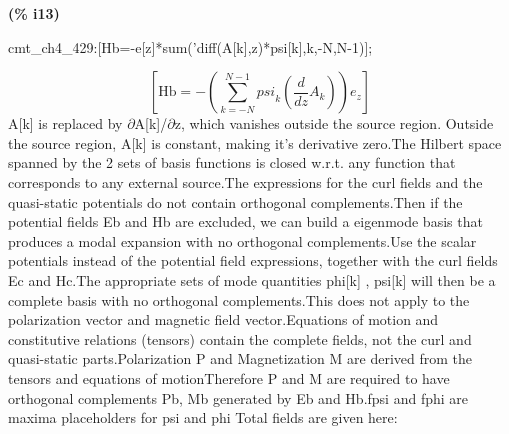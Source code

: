 \documentclass[fleqn]{article}
\begin{document}
\noindent
\begin{minipage}[t]{4.000000em}\color{red}\bfseries
(\% i13)	
\end{minipage}
\begin{minipage}[t]{\textwidth}\color{blue}
cmt\_ch4\_429:[Hb=-e[z]*sum('diff(A[k],z)*psi[k],k,-N,N-1)];
\end{minipage}
\[\displaystyle \tag{\% o13} 
\left[ \ensuremath{\mathrm{Hb}}=-\left( \sum_{k=-N}^{N-1}{\left. {{psi}_k} \left( \frac{d}{d z} {A_k}\right) \right.}\right)  {e_z}\right] \mbox{}
\]
A[k] is replaced by \ensuremath{\partial}A[k]/\ensuremath{\partial}z, which vanishes outside the source region. Outside the source region, A[k] is constant, making it's derivative zero.The Hilbert space spanned by the 2 sets of basis functions is closed w.r.t. any function that corresponds to any external source.The expressions for the curl fields and the quasi-static potentials do not contain orthogonal complements.Then if the potential fields Eb and Hb are excluded, we can build a eigenmode basis that produces a modal expansion with no orthogonal complements.Use the scalar potentials instead of the potential field expressions, together with the curl fields Ec and Hc.The appropriate sets of mode quantities  {phi[k] , psi[k]} will then be a complete basis with no orthogonal complements.This does not apply to the polarization vector and magnetic field vector.Equations of motion and constitutive relations (tensors) contain the complete fields, not the curl and quasi-static parts.Polarization P and Magnetization M are derived from the tensors and equations of motionTherefore P and M are required to have orthogonal complements Pb, Mb generated by Eb and Hb.fpsi and fphi are maxima placeholders for psi and phi Total fields are given here:
\end{document}
